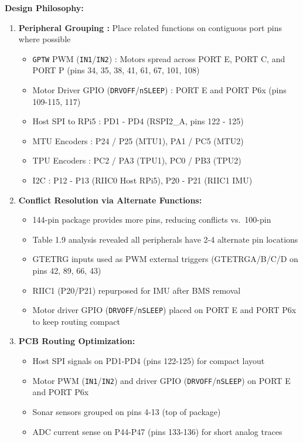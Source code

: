     \textbf{Design Philosophy:}
    \begin{enumerate}
    \item \textbf{Peripheral Grouping :
   } Place related functions on contiguous port pins where possible
    \begin{itemize}
    \item \texttt{GPTW} PWM (\texttt{IN1}/\texttt{IN2}) : Motors spread across PORT E, PORT C, and PORT P (pins 34, 35, 38, 41, 61, 67, 101, 108)
        \item Motor Driver GPIO (\texttt{DRVOFF}/\texttt{nSLEEP}) : PORT E and PORT P6x (pins 109-115, 117)
        \item Host SPI to RPi5 : PD1 - PD4 (RSPI2\_A, pins 122 - 125)
        \item MTU Encoders : P24 / P25 (MTU1), PA1 / PC5 (MTU2)
        \item TPU Encoders : PC2 / PA3 (TPU1), PC0 / PB3 (TPU2)
        \item I2C : P12 - P13 (RIIC0 Host RPi5), P20 - P21 (RIIC1 IMU)
    \end{itemize}

    \item \textbf{Conflict Resolution via Alternate Functions:}
    \begin{itemize}
        \item 144-pin package provides more pins, reducing conflicts vs.\ 100-pin
        \item Table 1.9 analysis revealed all peripherals have 2-4 alternate pin locations
        \item GTETRG inputs used as PWM external triggers (GTETRGA/B/C/D on pins 42, 89, 66, 43)
        \item RIIC1 (P20/P21) repurposed for IMU after BMS removal
        \item Motor driver GPIO (\texttt{DRVOFF}/\texttt{nSLEEP}) placed on PORT E and PORT P6x to keep routing compact
    \end{itemize}

        \item \textbf{PCB Routing Optimization:}
        \begin{itemize}
        \item Host SPI signals on PD1-PD4 (pins 122-125) for compact layout
        \item Motor PWM (\texttt{IN1}/\texttt{IN2}) and driver GPIO (\texttt{DRVOFF}/\texttt{nSLEEP}) on PORT E and PORT P6x
        \item Sonar sensors grouped on pins 4-13 (top of package)
        \item ADC current sense on P44-P47 (pins 133-136) for short analog traces
    \end{itemize}


\end{enumerate}
